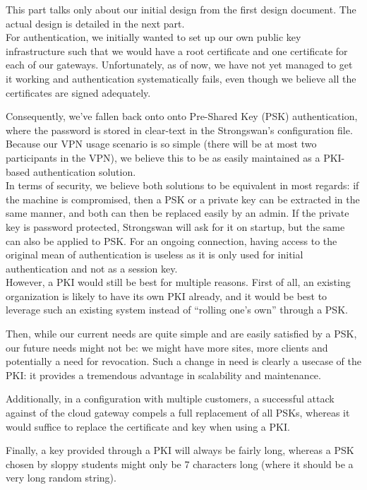 \documentclass[paper=a4, fontsize=11pt]{scrartcl}
\begin{document}
\huge \danger{} \normalsize
This part talks only about our initial design from the first design document.
The actual design is detailed in the next part.
\\

For authentication, we initially wanted to set up our own public key
infrastructure such that we would have a root certificate and one certificate
for each of our gateways.
Unfortunately, as of now, we have not yet managed to get it working and
authentication systematically fails, even though we believe all the certificates
are signed adequately.

Consequently, we've fallen back onto onto Pre-Shared Key (PSK) authentication,
where the password is stored in clear-text in the Strongswan's configuration
file.
Because our VPN usage scenario is so simple (there will be at most two
participants in the VPN), we believe this to be as easily maintained as a
PKI-based authentication solution.\\

In terms of security, we believe both solutions to be equivalent in most
regards: if the machine is compromised, then a PSK or a private key can be
extracted in the same manner, and both can then be replaced easily by an admin. 
If the private key is password protected, Strongswan will ask for it on startup,
but the same can also be applied to PSK\@.
For an ongoing connection, having access to the original mean of authentication
is useless as it is only used for initial authentication and not as a session
key.\\

However, a PKI would still be best for multiple reasons.
First of all, an existing organization is likely to have its own PKI already,
and it would be best to leverage such an existing system instead of ``rolling
one's own'' through a PSK\@.

Then, while our current needs are quite simple and are easily satisfied by a
PSK, our future needs might not be: we might have more sites, more clients and
potentially a need for revocation.
Such a change in need is clearly a usecase of the PKI\@: it provides a tremendous
advantage in scalability and maintenance.

Additionally, in a configuration with multiple customers, a successful attack
against of the cloud gateway compels a full replacement of all PSKs, whereas it
would suffice to replace the certificate and key when using a PKI\@.

Finally, a key provided through a PKI will always be fairly long,
whereas a PSK chosen by sloppy students might only be 7 characters long (where
it should be a very long random string).
\end{document}
